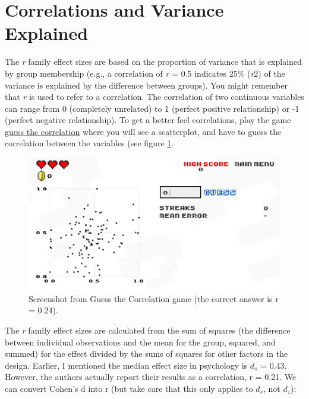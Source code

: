 \documentclass[
]{krantz}
\begin{document}
\hypertarget{correlations-and-variance-explained}{%
\section{Correlations and Variance Explained}\label{correlations-and-variance-explained}}

The \emph{r} family effect sizes are based on the proportion of variance that is explained by group membership (e.g., a correlation of \emph{r} = 0.5 indicates 25\% (\emph{r}2) of the variance is explained by the difference between groups). You might remember that \emph{r} is used to refer to a correlation. The correlation of two continuous variables can range from 0 (completely unrelated) to 1 (perfect positive relationship) or -1 (perfect negative relationship). To get a better feel correlations, play the game \href{http://guessthecorrelation.com/}{guess the correlation} where you will see a scatterplot, and have to guess the correlation between the variables (see figure \ref{fig:guesscorrelation}.

\begin{figure}

{\centering \includegraphics[width=1\linewidth]{images/guesscorrelation} 

}

\caption{Screenshot from Guess the Correlation game (the correct answer is r = 0.24).}\label{fig:guesscorrelation}
\end{figure}

The \emph{r} family effect sizes are calculated from the sum of squares (the difference between individual observations and the mean for the group, squared, and summed) for the effect divided by the sums of squares for other factors in the design. Earlier, I mentioned the median effect size in psychology is \(d_s\) = 0.43. However, the authors actually report their results as a correlation, r = 0.21. We can convert Cohen's d into r (but take care that this only applies to \(d_s\), not \(d_z\)):
\end{document}
